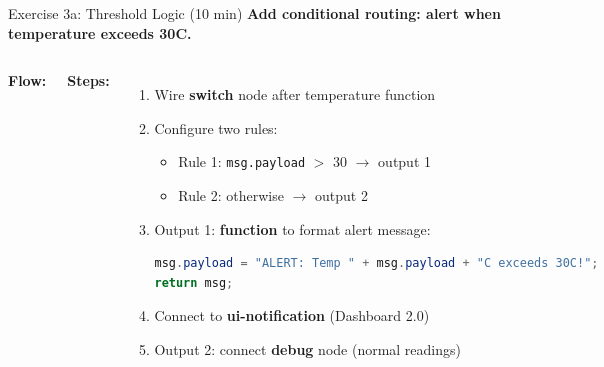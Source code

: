 \documentclass[aspectratio=169,11pt]{beamer}
\begin{document}
\begin{frame}[fragile,shrink=5]{Exercise 3a: Threshold Logic (10 min)}
    \textbf{Add conditional routing: alert when temperature exceeds 30\textdegree{}C.}

    \vspace{0.15cm}
    \begin{columns}
        \textbf{Flow:}

        \vspace{0.1cm}

        \vspace{0.15cm}
        \textbf{Steps:}
        \begin{enumerate}
            \item Wire \textbf{switch} node after temperature function
            \item Configure two rules:
            \begin{itemize}
                \item Rule 1: \texttt{msg.payload} $>$ 30 $\rightarrow$ output 1
                \item Rule 2: otherwise $\rightarrow$ output 2
            \end{itemize}
            \item Output 1: \textbf{function} to format alert message:
            \begin{lstlisting}[language=Java,basicstyle=\ttfamily\tiny]
msg.payload = "ALERT: Temp " + msg.payload + "C exceeds 30C!";
return msg;
            \end{lstlisting}
            \item Connect to \textbf{ui-notification} (Dashboard 2.0)
            \item Output 2: connect \textbf{debug} node (normal readings)
        \end{enumerate}


\end{columns}
\end{frame}
\end{document}
